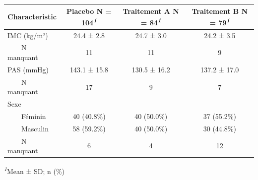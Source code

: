 \documentclass[
]{book}
\begin{document}
\begin{table}[t]
\fontsize{12.0pt}{14.0pt}\selectfont
\begin{tabular*}{\linewidth}{@{\extracolsep{\fill}}lccc}
\toprule
\textbf{Characteristic} & \textbf{Placebo}  N = 104\textsuperscript{\textit{1}} & \textbf{Traitement A}  N = 84\textsuperscript{\textit{1}} & \textbf{Traitement B}  N = 79\textsuperscript{\textit{1}} \\ 
\midrule\addlinespace[2.5pt]
IMC (kg/m²) & 24.4 ± 2.8 & 24.7 ± 3.0 & 24.2 ± 3.5 \\ 
    N manquant & 11 & 11 & 9 \\ 
PAS (mmHg) & 143.1 ± 15.8 & 130.5 ± 16.2 & 137.2 ± 17.0 \\ 
    N manquant & 17 & 9 & 7 \\ 
Sexe &  &  &  \\ 
    Féminin & 40 (40.8\%) & 40 (50.0\%) & 37 (55.2\%) \\ 
    Masculin & 58 (59.2\%) & 40 (50.0\%) & 30 (44.8\%) \\ 
    N manquant & 6 & 4 & 12 \\ 
\bottomrule
\end{tabular*}
\begin{minipage}{\linewidth}
\vspace{.05em}
\textsuperscript{\textit{1}}Mean ± SD; n (\%)\\
\end{minipage}
\end{table}
\end{document}
